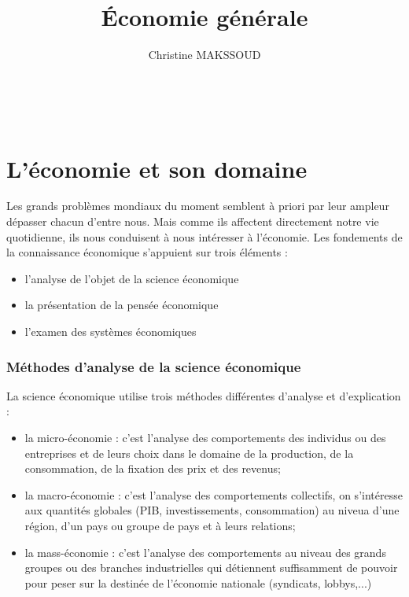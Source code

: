 \documentclass[11pt]{article}
\begin{document}
    \title{Économie générale}
    \author{Christine MAKSSOUD}
    \date{}

\maketitle
\setcounter{page}{0} \thispagestyle{empty} %
\newpage
\setcounter{page}{2} %

\newpage
~\\
\renewcommand{\contentsname}{Sommaire}
\tableofcontents

\newpage
\part{L'économie et son domaine}
	Les grands problèmes mondiaux du moment semblent à priori par leur ampleur dépasser chacun d'entre nous. Mais comme ils affectent directement notre vie quotidienne, ils nous conduisent à nous intéresser à l'économie. Les fondements de la connaissance économique s'appuient sur trois éléments :
	\begin{itemize}
		\item l'analyse de l'objet de la science économique
		\item la présentation de la pensée économique
		\item l'examen des systèmes économiques
	\end{itemize}
	
	\section{Méthodes d'analyse de la science économique}
		La science économique utilise trois méthodes différentes d'analyse et d'explication :
		\begin{itemize}
			\item la micro-économie : c'est l'analyse des comportements des individus ou des entreprises et de leurs choix dans le domaine de la production, de la consommation, de la fixation des prix et des revenus;
			\item la macro-économie : c'est l'analyse des comportements collectifs, on s'intéresse aux quantités globales (PIB, investissements, consommation) au niveua d'une région, d'un pays ou groupe de pays et à leurs relations;
			\item la mass-économie : c'est l'analyse des comportements au niveau des grands groupes ou des branches industrielles qui détiennent suffisamment de pouvoir pour peser sur la destinée de l'économie nationale (syndicats, lobbys,...)
		\end{itemize}
		
\end{document}
